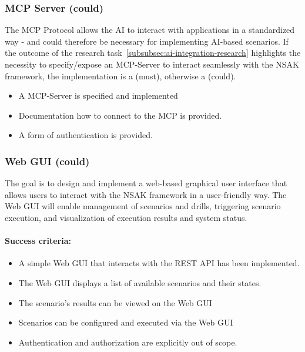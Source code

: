 \subsubsection{MCP Server (could)}\label{subsubsec:mcp-server}

The \gls{MCP} Protocol allows the \gls{AI} to interact with applications in a standardized way - and could therefore be necessary for implementing \gls{AI}-based scenarios.
If the outcome of the research task~\ref{subsubsec:ai-integration-research} highlights the necessity to specify/expose an \gls{MCP}-Server to interact seamlessly with the \gls{NSAK} framework, the implementation is a (must), otherwise a (could).

\begin{itemize}
	\item A \gls{MCP}-Server is specified and implemented
	\item Documentation how to connect to the \gls{MCP} is provided.
	\item A form of authentication is provided.
\end{itemize}

\subsubsection{Web GUI (could)}\label{subsubsec:web-gui}

The goal is to design and implement a web-based graphical user interface that allows users to interact with the \gls{NSAK} framework in a user-friendly way.
The Web \gls{GUI} will enable management of scenarios and drills, triggering scenario execution, and visualization of execution results and system status.

\paragraph{Success criteria:}

\begin{itemize}
	\item A simple Web \gls{GUI} that interacts with the REST \gls{API} has been implemented.
	\item The Web \gls{GUI} displays a list of available scenarios and their states.
	\item The scenario's results can be viewed on the Web \gls{GUI}
	\item Scenarios can be configured and executed via the Web \gls{GUI}
	\item Authentication and authorization are explicitly out of scope.
\end{itemize}
\newpage

